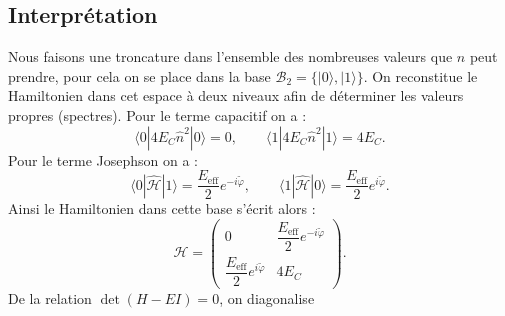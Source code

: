 \subsection{Interprétation}
Nous faisons une troncature dans l'ensemble des nombreuses valeurs que $n$ peut prendre, pour cela on se place dans la base $\mathcal{B}_2 = \{ |0\rangle, |1\rangle \}$. On reconstitue le Hamiltonien dans cet espace à  deux niveaux afin de déterminer les valeurs propres (spectres).
Pour le terme capacitif on a :
\begin{equation}
\langle 0|4E_C\hat{n}^2|0\rangle = 0, 
\qquad
\langle 1|4E_C\hat{n}^2|1\rangle = 4E_C.
\end{equation}
Pour le terme Josephson on a :
\begin{equation}
\langle 0|\mathcal{\hat{H}}|1\rangle = \frac{E_{\mathrm{eff}}}{2}e^{-i\tilde{\varphi}},
\qquad
\langle 1|\mathcal{\hat{H}}|0\rangle = \frac{E_{\mathrm{eff}}}{2}e^{i\tilde{\varphi}}.
\end{equation}
Ainsi le Hamiltonien dans cette base s'écrit alors :
\begin{equation}
\mathcal{H} =
\begin{pmatrix}
0 & \dfrac{E_{\mathrm{eff}}}{2} e^{-i\tilde{\varphi}} \\
\dfrac{E_{\mathrm{eff}}}{2} e^{i\tilde{\varphi}} & 4E_C
\end{pmatrix}.
\end{equation}
De la relation  $\det(H - E I) = 0$, on diagonalise 


